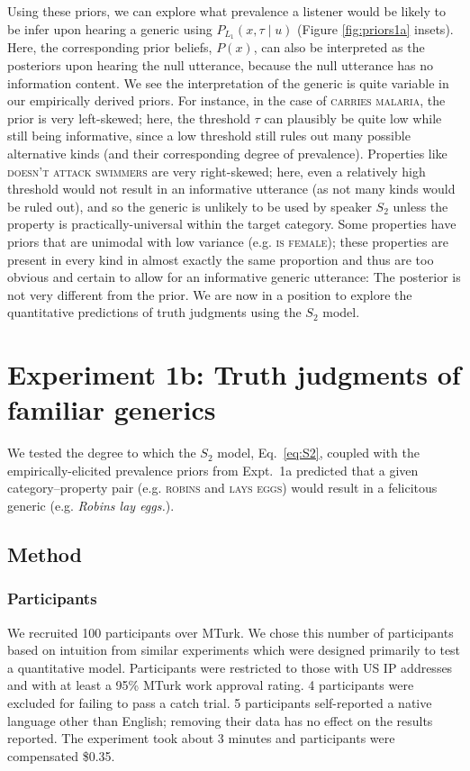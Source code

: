 \documentclass[12pt,letterpaper]{article}
\begin{document}
Using these priors, we can explore what prevalence a listener would be likely to be infer upon hearing a generic using $P_{L_{1}}(x , \tau \mid u)$ (Figure \ref{fig:priors1a} insets). 
Here, the corresponding prior beliefs, $P(x)$, can also be interpreted as the posteriors upon hearing the null utterance, because the null utterance has no information content.
We see the interpretation of the generic is quite variable in our empirically derived priors.
For instance, in the case of \textsc{carries malaria}, the prior is very left-skewed; here, the threshold $\tau$ can plausibly be quite low while still being informative, since a low threshold still rules out many possible alternative kinds (and their corresponding degree of prevalence).
Properties like \textsc{doesn't attack swimmers} are very right-skewed; here, even a relatively high threshold would not result in an informative utterance (as not many kinds would be ruled out), and so the generic is unlikely to be used by speaker $S_2$ unless the property is practically-universal within the target category. 
Some properties have priors that are unimodal with low variance (e.g. \textsc{is female}); these properties are present in every kind in almost exactly the same proportion and thus are too obvious and certain to allow for an informative generic utterance: The posterior is not very different from the prior. 
We are now in a position to explore the quantitative predictions of truth judgments using the $S_2$ model.

\section*{Experiment 1b: Truth judgments of familiar generics}


We tested the degree to which the $S_2$ model, Eq.~\ref{eq:S2}, coupled with the empirically-elicited prevalence priors from Expt.~1a predicted that a given category--property pair (e.g. \textsc{robins} and \textsc{lays eggs}) would result in a felicitous generic (e.g. \emph{Robins lay eggs.}). 


\subsection*{Method}

\subsubsection*{Participants}

We recruited 100 participants over MTurk. 
We chose this number of participants based on intuition from similar experiments which were designed primarily to test a quantitative model.
Participants were restricted to those with US IP addresses and with at least a 95\% MTurk work approval rating. 
4 participants were excluded for failing to pass a catch trial.
5 participants self-reported a native language other than English; removing their data has no effect on the results reported. 
The experiment took about 3 minutes and participants were compensated \$0.35.
\end{document}
